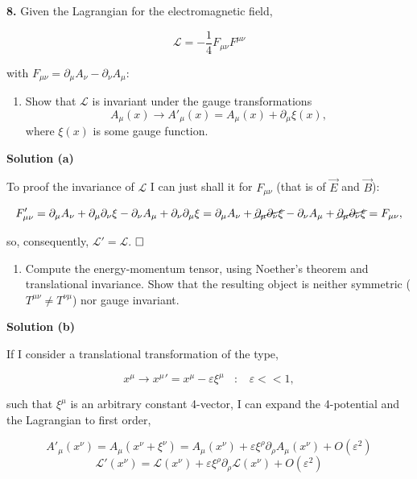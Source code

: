 \documentclass[12pt]{article}
\newcommand{\qedwhite}{\hfill \ensuremath{\Box}}
\begin{document}
\pagestyle{fancy}

\textbf{8.} Given the Lagrangian for the electromagnetic field,

\[ \mathcal{L} = - \frac{1}{4} F_{\mu\nu}F^{\mu\nu} \]

with \( F_{\mu\nu} = \partial_\mu A_\nu - \partial_\nu A_\mu \):

\begin{enumerate}[label=(\alph*)]
    \item Show that \(\mathcal{L}\) is invariant under the gauge transformations \[ A_\mu(x) \rightarrow A'_\mu(x) = A_\mu(x) + \partial_\mu \xi(x), \] where \(\xi(x)\) is some gauge function.
\end{enumerate}

\color{blue}

\textbf{Solution (a)}

To proof the invariance of \( \mathcal{L} \) I can just shall it for \( F_{\mu\nu} \) (that is of \( \vec{E} \) and \( \vec{B} \)):

\[
    F'_{\mu\nu} = \partial_\mu A_\nu + \partial_\mu \partial_\nu \xi - \partial_\nu A_\mu + \partial_\nu \partial_\mu \xi = \partial_\mu A_\nu + \cancel{\partial_\mu \partial_\nu \xi} - \partial_\nu A_\mu +  \cancel{\partial_\mu \partial_\nu \xi} = F_{\mu\nu},
\]

so, consequently, \( \mathcal{L}' = \mathcal{L} \). $\qedwhite$

\color{black}

\begin{enumerate}[label=(\alph*), start = 2]
    \item Compute the energy-momentum tensor, using Noether's theorem and translational invariance. Show that the resulting object is neither symmetric (\( T^{\mu\nu} \neq T^{\nu\mu} \)) nor gauge invariant.
\end{enumerate}

\color{blue}

\textbf{Solution (b)}

If I consider a translational transformation of the type,

\[ x^\mu \longrightarrow {x^\mu}' = x^\mu - \varepsilon \xi^\mu ~~~~ : ~~~~ \varepsilon << 1, \]

such that \(\xi^\mu\) is an arbitrary constant 4-vector, I can expand the 4-potential and the Lagrangian to first order,

\[ A'_\mu (x^\nu) = A_\mu (x^\nu + \xi^\nu) = A_\mu (x^\nu) + \varepsilon \xi^\rho \partial_\rho A_\mu (x^\nu) + O(\varepsilon^2) \]
\[ \mathcal{L}' (x^\nu) = \mathcal{L} (x^\nu) + \varepsilon \xi^\rho \partial_\rho \mathcal{L} (x^\nu) + O(\varepsilon^2) \]
\end{document}
